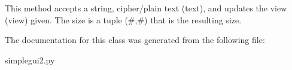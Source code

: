 \begin{DoxyVerb}    This method accepts a string, cipher/plain text (text), and updates the view (view) given.
    The size is a tuple (#,#) that is the resulting size.
\end{DoxyVerb}
 

The documentation for this class was generated from the following file\-:\begin{DoxyCompactItemize}
\item 
simplegui2.\-py\end{DoxyCompactItemize}
